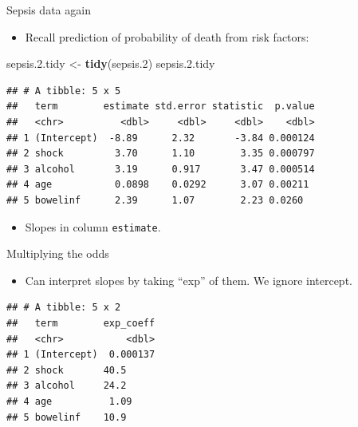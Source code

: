 \documentclass[ignorenonframetext,]{beamer}
\newenvironment{Shaded}{\begin{snugshade}}{\end{snugshade}}
\newcommand{\DataTypeTok}[1]{\textcolor[rgb]{0.13,0.29,0.53}{#1}}
\newcommand{\FloatTok}[1]{\textcolor[rgb]{0.00,0.00,0.81}{#1}}
\newcommand{\KeywordTok}[1]{\textcolor[rgb]{0.13,0.29,0.53}{\textbf{#1}}}
\newcommand{\NormalTok}[1]{#1}
\newcommand{\OperatorTok}[1]{\textcolor[rgb]{0.81,0.36,0.00}{\textbf{#1}}}
\newcommand{\StringTok}[1]{\textcolor[rgb]{0.31,0.60,0.02}{#1}}
\providecommand{\tightlist}{%
  \setlength{\itemsep}{0pt}\setlength{\parskip}{0pt}}
\begin{document}
\begin{frame}[fragile]{Sepsis data again}
\protect\hypertarget{sepsis-data-again}{}

\begin{itemize}
\tightlist
\item
  Recall prediction of probability of death from risk factors:
\end{itemize}

\begin{Shaded}
\begin{Highlighting}[]
\NormalTok{sepsis.}\FloatTok{2.}\NormalTok{tidy <-}\StringTok{ }\KeywordTok{tidy}\NormalTok{(sepsis}\FloatTok{.2}\NormalTok{)}
\NormalTok{sepsis.}\FloatTok{2.}\NormalTok{tidy}
\end{Highlighting}
\end{Shaded}

\begin{verbatim}
## # A tibble: 5 x 5
##   term        estimate std.error statistic  p.value
##   <chr>          <dbl>     <dbl>     <dbl>    <dbl>
## 1 (Intercept)  -8.89      2.32       -3.84 0.000124
## 2 shock         3.70      1.10        3.35 0.000797
## 3 alcohol       3.19      0.917       3.47 0.000514
## 4 age           0.0898    0.0292      3.07 0.00211 
## 5 bowelinf      2.39      1.07        2.23 0.0260
\end{verbatim}

\begin{itemize}
\tightlist
\item
  Slopes in column \texttt{estimate}.
\end{itemize}

\end{frame}

\begin{frame}[fragile]{Multiplying the odds}
\protect\hypertarget{multiplying-the-odds}{}

\begin{itemize}
\tightlist
\item
  Can interpret slopes by taking ``exp'' of them. We ignore intercept.
\end{itemize}

\begin{Shaded}
\end{Shaded}

\begin{verbatim}
## # A tibble: 5 x 2
##   term        exp_coeff
##   <chr>           <dbl>
## 1 (Intercept)  0.000137
## 2 shock       40.5     
## 3 alcohol     24.2     
## 4 age          1.09    
## 5 bowelinf    10.9
\end{verbatim}

\end{frame}
\end{document}
